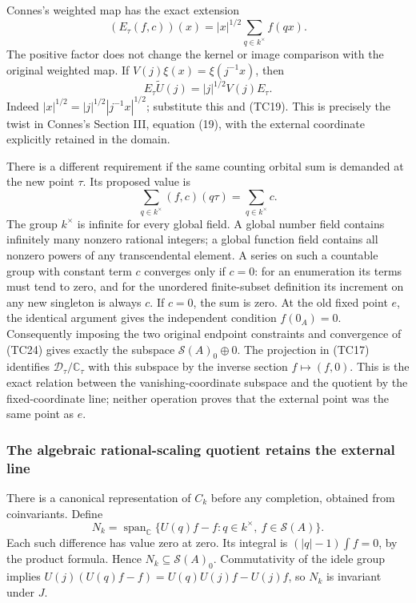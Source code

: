 \documentclass[
  10pt,
]{article}
\begin{document}
Connes's weighted map has the exact extension \[
(E_\tau(f,c))(x)=|x|^{1/2}\sum_{q\in k^\times}f(qx).
\tag{TC22}
\] The positive factor does not change the kernel or image comparison
with the original weighted map. If \(V(j)\xi(x)=\xi(j^{-1}x)\), then \[
E_\tau\widetilde U(j)=|j|^{1/2}V(j)E_\tau.
\tag{TC23}
\] Indeed \(|x|^{1/2}=|j|^{1/2}|j^{-1}x|^{1/2}\); substitute this and
(TC19). This is precisely the twist in Connes's Section III, equation
(19), with the external coordinate explicitly retained in the domain.

There is a different requirement if the same counting orbital sum is
demanded at the new point \(\tau\). Its proposed value is \[
\sum_{q\in k^\times}(f,c)(q\tau)
=\sum_{q\in k^\times}c.
\tag{TC24}
\] The group \(k^\times\) is infinite for every global field. A global
number field contains infinitely many nonzero rational integers; a
global function field contains all nonzero powers of any transcendental
element. A series on such a countable group with constant term \(c\)
converges only if \(c=0\): for an enumeration its terms must tend to
zero, and for the unordered finite-subset definition its increment on
any new singleton is always \(c\). If \(c=0\), the sum is zero. At the
old fixed point \(e\), the identical argument gives the independent
condition \(f(0_A)=0\). Consequently imposing the two original endpoint
constraints and convergence of (TC24) gives exactly the subspace
\(\mathcal S(A)_0\oplus0\). The projection in (TC17) identifies
\(\mathcal D_\tau/\mathbb C_\tau\) with this subspace by the inverse
section \(f\mapsto(f,0)\). This is the exact relation between the
vanishing-coordinate subspace and the quotient by the fixed-coordinate
line; neither operation proves that the external point was the same
point as \(e\).

\subsubsection{The algebraic rational-scaling quotient retains the
external
line}\label{the-algebraic-rational-scaling-quotient-retains-the-external-line}

There is a canonical representation of \(C_k\) before any completion,
obtained from coinvariants. Define \[
N_k=\operatorname{span}_{\mathbb C}
\{U(q)f-f:q\in k^\times,\ f\in\mathcal S(A)\}.
\tag{TC24a}
\] Each such difference has value zero at zero. Its integral is
\((|q|-1)\int f=0\), by the product formula. Hence
\(N_k\subseteq\mathcal S(A)_0\). Commutativity of the idele group
implies \(U(j)(U(q)f-f)=U(q)U(j)f-U(j)f\), so \(N_k\) is invariant under
\(J\).
\end{document}
